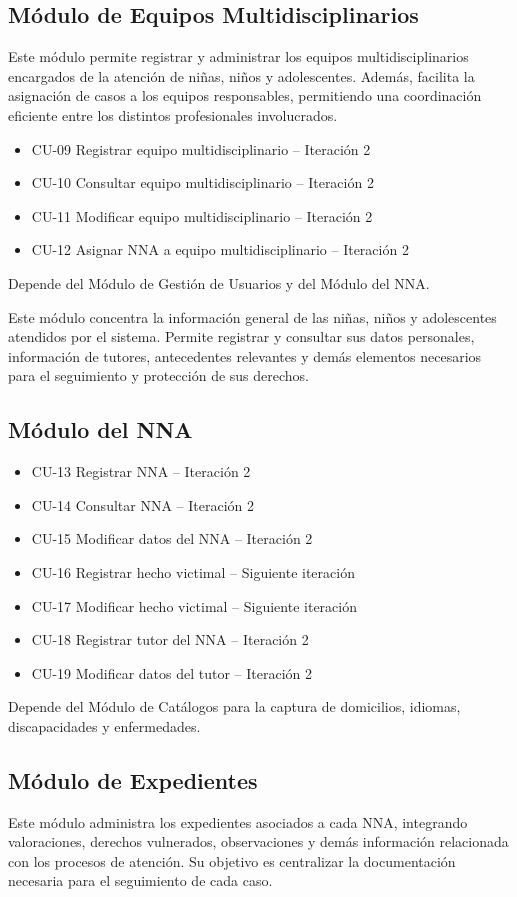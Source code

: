 \subsection*{Módulo de Equipos Multidisciplinarios}
Este módulo permite registrar y administrar los equipos multidisciplinarios encargados de la atención de niñas, niños y adolescentes. Además, facilita la asignación de casos a los equipos responsables, permitiendo una coordinación eficiente entre los distintos profesionales involucrados.


\begin{itemize}
	\item CU-09 Registrar equipo multidisciplinario -- Iteración 2
	\item CU-10 Consultar equipo multidisciplinario -- Iteración 2
	\item CU-11 Modificar equipo multidisciplinario -- Iteración 2
	\item CU-12 Asignar NNA a equipo multidisciplinario -- Iteración 2
\end{itemize}
Depende del Módulo de Gestión de Usuarios y del Módulo del NNA.

Este módulo concentra la información general de las niñas, niños y adolescentes atendidos por el sistema. Permite registrar y consultar sus datos personales, información de tutores, antecedentes relevantes y demás elementos necesarios para el seguimiento y protección de sus derechos.

\subsection*{Módulo del NNA}
\begin{itemize}
	\item CU-13 Registrar NNA -- Iteración 2
	\item CU-14 Consultar NNA -- Iteración 2
	\item CU-15 Modificar datos del NNA -- Iteración 2
	\item CU-16 Registrar hecho victimal -- Siguiente iteración
	\item CU-17 Modificar hecho victimal -- Siguiente iteración
	\item CU-18 Registrar tutor del NNA -- Iteración 2
	\item CU-19 Modificar datos del tutor -- Iteración 2
\end{itemize}
Depende del Módulo de Catálogos para la captura de domicilios, idiomas, discapacidades y enfermedades.

\subsection*{Módulo de Expedientes}
Este módulo administra los expedientes asociados a cada NNA, integrando valoraciones, derechos vulnerados, observaciones y demás información relacionada con los procesos de atención. Su objetivo es centralizar la documentación necesaria para el seguimiento de cada caso.

